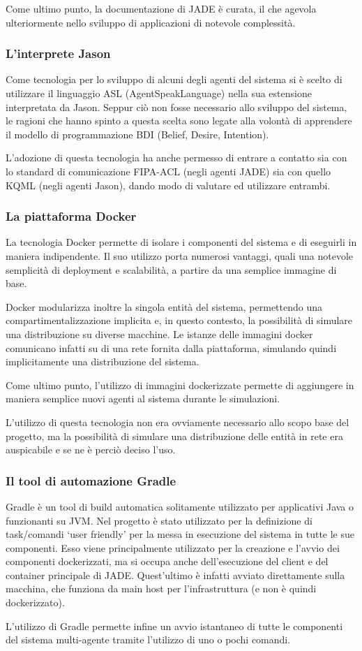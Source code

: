 Come ultimo punto, la documentazione di JADE è curata, il che agevola ulteriormente nello sviluppo di applicazioni di notevole complessità.

\subsubsection{L'interprete Jason}
Come tecnologia per lo sviluppo di alcuni degli agenti del sistema si è scelto di utilizzare il linguaggio ASL (AgentSpeakLanguage) nella sua estensione interpretata da Jason. Seppur ciò non fosse necessario allo sviluppo del sistema, le ragioni che hanno spinto a questa scelta sono legate alla volontà di apprendere il modello di programmazione BDI (Belief, Desire, Intention).

L'adozione di questa tecnologia ha anche permesso di entrare a contatto sia con lo standard di comunicazione FIPA-ACL (negli agenti JADE) sia con quello KQML (negli agenti Jason), dando modo di valutare ed utilizzare entrambi.

\subsubsection{La piattaforma Docker}
La tecnologia Docker permette di isolare i componenti del sistema e di eseguirli in maniera indipendente. Il suo utilizzo porta numerosi vantaggi, quali una notevole semplicità di deployment e scalabilità, a partire da una semplice immagine di base.

Docker modularizza inoltre la singola entità del sistema, permettendo una compartimentalizzazione implicita e, in questo contesto, la possibilità di simulare una distribuzione su diverse macchine. Le istanze delle immagini docker comunicano infatti su di una rete fornita dalla piattaforma, simulando quindi implicitamente una distribuzione del sistema.

Come ultimo punto, l'utilizzo di immagini dockerizzate permette di aggiungere in maniera semplice nuovi agenti al sistema durante le simulazioni.

\parag
L'utilizzo di questa tecnologia non era ovviamente necessario allo scopo base del progetto, ma la possibilità di simulare una distribuzione delle entità in rete era auspicabile e se ne è perciò deciso l'uso.

\subsubsection{Il tool di automazione Gradle}
Gradle è un tool di build automatica solitamente utilizzato per applicativi Java o funzionanti su JVM. Nel progetto è stato utilizzato per la definizione di task/comandi `user friendly' per la messa in esecuzione del sistema in tutte le sue componenti. Esso viene principalmente utilizzato per la creazione e l'avvio dei componenti dockerizzati, ma si occupa anche dell'esecuzione del client e del container principale di JADE. Quest'ultimo è infatti avviato direttamente sulla macchina, che funziona da main host per l'infrastruttura (e non è quindi dockerizzato).

L'utilizzo di Gradle permette infine un avvio istantaneo di tutte le componenti del sistema multi-agente tramite l'utilizzo di uno o pochi comandi.
